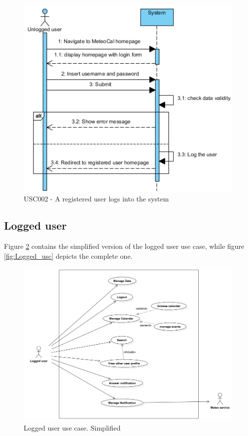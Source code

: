\documentclass[10pt,a4paper,titlepage]{article}
\begin{document}
\begin{figure}[h]
\centering
\includegraphics[width=\linewidth]{./Sequence_diag/USC002.png}
\caption[USC002]{USC002 - A registered user logs into the system}
\label{fig:USC002}
\end{figure}

\clearpage
\subsection{Logged user}
Figure \ref{fig:Logged_usc_simple} contains the simplified version of the logged user use case, while figure \ref{fig:Logged_usc} depicts the complete one.

\begin{figure}[h!]
\centering
\includegraphics[width=\linewidth]{./Use_case/logged_usecase_simple.png}
\caption[Logged_usc_simple]{Logged user use case. Simplified}
\label{fig:Logged_usc_simple}
\end{figure}
\end{document}
